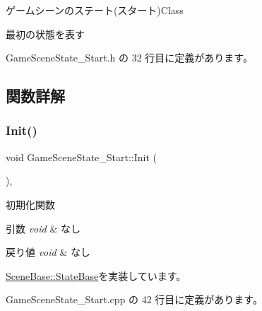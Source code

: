 ゲームシーンのステート(スタート)Class

最初の状態を表す 

 Game\+Scene\+State\+\_\+\+Start.\+h の 32 行目に定義があります。



\subsection{関数詳解}
\mbox{\label{class_game_scene_state___start_ae921c57f349fbb2f00a197d40a3404b7}} 
\subsubsection{\texorpdfstring{Init()}{Init()}}
{\footnotesize\ttfamily void Game\+Scene\+State\+\_\+\+Start\+::\+Init (\begin{DoxyParamCaption}{ }\end{DoxyParamCaption})\hspace{0.3cm}{\ttfamily [override]}, {\ttfamily [virtual]}}



初期化関数 


\begin{DoxyParams}{引数}
{\em void} & なし \\
\hline
\end{DoxyParams}

\begin{DoxyRetVals}{戻り値}
{\em void} & なし \\
\hline
\end{DoxyRetVals}


\mbox{\hyperlink{class_scene_base_1_1_state_base_a33350231b039a2178c19beac0211c5b8}{Scene\+Base\+::\+State\+Base}}を実装しています。



 Game\+Scene\+State\+\_\+\+Start.\+cpp の 42 行目に定義があります。

